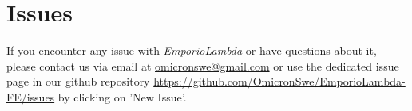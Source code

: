 \section{Issues}
If you encounter any issue with \textit{EmporioLambda} or have questions about it, please contact us via email at \href{mailto:omicronswe@gmail.com}{omicronswe@gmail.com} or use the dedicated issue page in our github repository \url{https://github.com/OmicronSwe/EmporioLambda-FE/issues} by clicking on 'New Issue'.